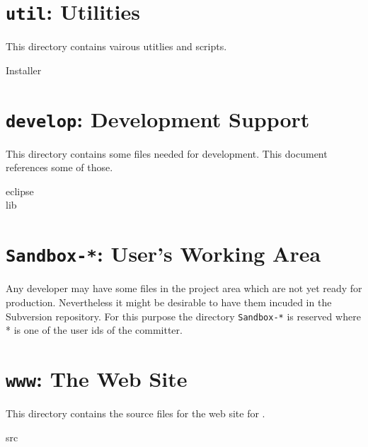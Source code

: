 \section{\texttt{util}: Utilities}

This directory contains vairous utitlies and scripts.

\begin{description}
\item[Installer] 
\end{description}

\section{\texttt{develop}: Development Support}

This directory contains some files needed for development. This
document references some of those.

\begin{description}
\item[eclipse] 
\item[lib] 
\end{description}

\section{\texttt{Sandbox-*}: User's Working Area}

Any developer may have some files in the project area which are not
yet ready for production. Nevertheless it might be desirable to have
them incuded in the Subversion repository.  For this purpose the
directory \texttt{Sandbox-*} is reserved where * is one of the user
ids of the committer.

\section{\texttt{www}: The Web Site}

This directory contains the source files for the web site for \ExTeX.

\begin{description}
\item[src] 
\end{description}

